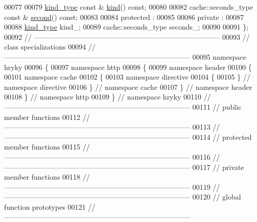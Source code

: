 \begin{DoxyCode}
00077 
00079     \hyperlink{classhryky_1_1_kind}{kind_type} \textcolor{keyword}{const} & \hyperlink{classhryky_1_1http_1_1header_1_1cache_1_1directive_1_1_second_a0c0fa7cf386959abd9aa465ad24a14d4}{kind}() \textcolor{keyword}{const};
00080 
00082     cache::seconds\_type \textcolor{keyword}{const} & \hyperlink{classhryky_1_1http_1_1header_1_1cache_1_1directive_1_1_second_a636cd6793f9f3e4c7fa0d2220cc6dae7}{second}() \textcolor{keyword}{const};
00083 
00084 \textcolor{keyword}{protected} :
00085 
00086 \textcolor{keyword}{private} :
00087 
00088     \hyperlink{classhryky_1_1_kind}{kind_type}               kind\_;
00089     cache::seconds\_type     seconds\_;
00090 
00091 \};
00092 \textcolor{comment}{//
      ------------------------------------------------------------------------------}
00093 \textcolor{comment}{// class specializations}
00094 \textcolor{comment}{//
      ------------------------------------------------------------------------------}
00095 \textcolor{keyword}{namespace }hryky
00096 \{
00097 \textcolor{keyword}{namespace }http
00098 \{
00099 \textcolor{keyword}{namespace }header
00100 \{
00101 \textcolor{keyword}{namespace }cache
00102 \{
00103 \textcolor{keyword}{namespace }directive
00104 \{
00105 \} \textcolor{comment}{// namespace directive}
00106 \} \textcolor{comment}{// namespace cache}
00107 \} \textcolor{comment}{// namespace header}
00108 \} \textcolor{comment}{// namespace http}
00109 \} \textcolor{comment}{// namespace hryky}
00110 \textcolor{comment}{//
      ------------------------------------------------------------------------------}
00111 \textcolor{comment}{// public member functions}
00112 \textcolor{comment}{//
      ------------------------------------------------------------------------------}
00113 \textcolor{comment}{//
      ------------------------------------------------------------------------------}
00114 \textcolor{comment}{// protected member functions}
00115 \textcolor{comment}{//
      ------------------------------------------------------------------------------}
00116 \textcolor{comment}{//
      ------------------------------------------------------------------------------}
00117 \textcolor{comment}{// private member functions}
00118 \textcolor{comment}{//
      ------------------------------------------------------------------------------}
00119 \textcolor{comment}{//
      ------------------------------------------------------------------------------}
00120 \textcolor{comment}{// global function prototypes}
00121 \textcolor{comment}{//
      ------------------------------------------------------------------------------}

\end{DoxyCode}
